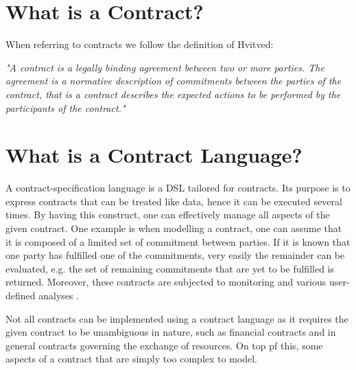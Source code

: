 \documentclass{ituthesis}
\begin{document}
\section{What is a Contract?}

When referring to contracts we follow the definition of Hvitved:
\begin{displayquote}
\textit{"A contract is a legally binding agreement between two or more parties. The agreement is a normative description of commitments between the parties of the contract, that is a contract describes the expected actions to be performed by the participants of the contract."}
\cite{hvitved2011contract}
\end{displayquote}

\section{What is a Contract Language?}
A contract-specification language is a DSL tailored for contracts. Its purpose is to express contracts that can be treated like data, hence it can be executed several times. By having this construct, one can effectively manage all aspects of the given contract. One example is when modelling a contract, one can assume that it is composed of a limited set of commitment between parties. If it is known that one party has fulfilled one of the commitments, very easily the remainder can be evaluated, e.g. the set of remaining commitments that are yet to be fulfilled is returned. Moreover, these contracts are subjected to monitoring and various user-defined analyses \cite{andersen2006compositional}.

Not all contracts can be implemented using a contract language as it requires the given contract to be unambiguous in nature, such as financial contracts and in general contracts governing the exchange of resources. On top pf this, some aspects of a contract that are simply too complex to model. %

\end{document}
